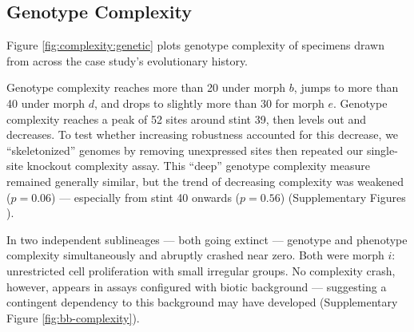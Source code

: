 


\subsection{Genotype Complexity}
\label{sec:supp-genotype-complexity}

Figure \ref{fig:complexity:genetic} plots genotype complexity of specimens drawn from across the case study's evolutionary history.

Genotype complexity reaches more than 20 under morph $b$, jumps to more than 40 under morph $d$, and drops to slightly more than 30 for morph $e$.
Genotype complexity reaches a peak of 52 sites around stint 39, then levels out and decreases.
To test whether increasing robustness accounted for this decrease, we ``skeletonized'' genomes by removing unexpressed sites then repeated our single-site knockout complexity assay.
This ``deep'' genotype complexity measure remained generally similar, but the trend of decreasing complexity was weakened ($p = 0.06$) --- especially from stint 40 onwards ($p = 0.56$) (Supplementary Figures ).

In two independent sublineages --- both going extinct --- genotype and phenotype complexity simultaneously and abruptly crashed near zero.
Both were morph $i$: unrestricted cell proliferation with small irregular groups.
No complexity crash, however, appears in assays configured with biotic background --- suggesting a contingent dependency to this background may have developed (Supplementary Figure \ref{fig:bb-complexity}).

